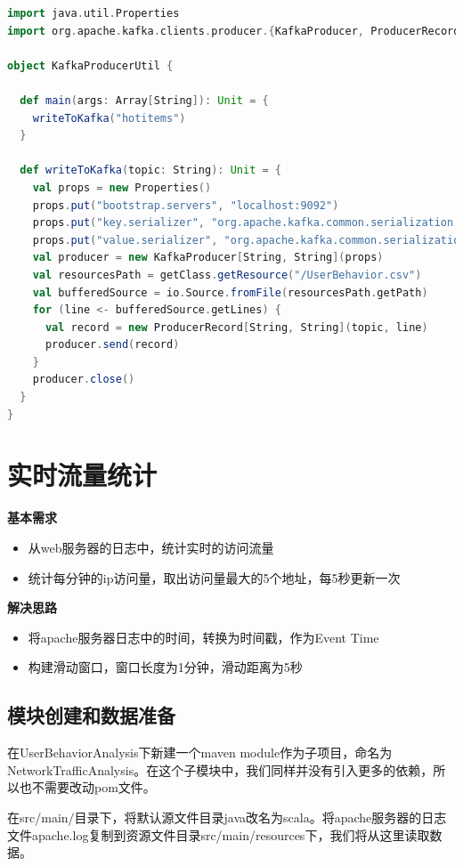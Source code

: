 \documentclass[oneside]{ctexbook}
\begin{document}
\begin{lstlisting}[language=scala]
import java.util.Properties
import org.apache.kafka.clients.producer.{KafkaProducer, ProducerRecord}

object KafkaProducerUtil {

  def main(args: Array[String]): Unit = {
    writeToKafka("hotitems")
  }

  def writeToKafka(topic: String): Unit = {
    val props = new Properties()
    props.put("bootstrap.servers", "localhost:9092")
    props.put("key.serializer", "org.apache.kafka.common.serialization.StringSerializer")
    props.put("value.serializer", "org.apache.kafka.common.serialization.StringSerializer")
    val producer = new KafkaProducer[String, String](props)
    val resourcesPath = getClass.getResource("/UserBehavior.csv")
    val bufferedSource = io.Source.fromFile(resourcesPath.getPath)
    for (line <- bufferedSource.getLines) {
      val record = new ProducerRecord[String, String](topic, line)
      producer.send(record)
    }
    producer.close()
  }
}
\end{lstlisting}

\section{实时流量统计}

\textbf{基本需求}
\begin{itemize}
\item 从web服务器的日志中，统计实时的访问流量
\item 统计每分钟的ip访问量，取出访问量最大的5个地址，每5秒更新一次
\end{itemize}
\textbf{解决思路}
\begin{itemize}
\item 将apache服务器日志中的时间，转换为时间戳，作为Event Time
\item 构建滑动窗口，窗口长度为1分钟，滑动距离为5秒
\end{itemize}

\subsection{模块创建和数据准备}

在UserBehaviorAnalysis下新建一个maven module作为子项目，命名为NetworkTrafficAnalysis。在这个子模块中，我们同样并没有引入更多的依赖，所以也不需要改动pom文件。

在src/main/目录下，将默认源文件目录java改名为scala。将apache服务器的日志文件apache.log复制到资源文件目录src/main/resources下，我们将从这里读取数据。
\end{document}
